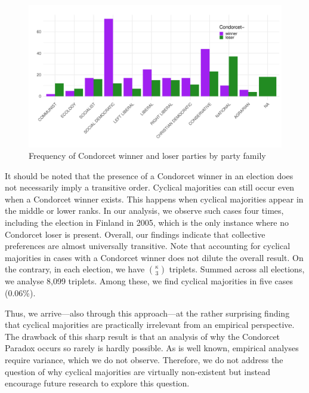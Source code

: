\documentclass[12pt]{scrartcl}
\begin{document}
\begin{figure}
	\centering
	\caption{Frequency of Condorcet winner and loser parties by party family \label{f1}}
\includegraphics[width=\linewidth]{barplotraw}
\end{figure}

It should be noted that the presence of a Condorcet winner in an election does not necessarily imply a transitive order. Cyclical majorities can still occur even when a Condorcet winner exists. This happens when cyclical majorities appear in the middle or lower ranks. In our analysis, we observe such cases four times, including the election in Finland in 2005, which is the only instance where no Condorcet loser is present. Overall, our findings indicate that collective preferences are almost universally transitive. Note that accounting for cyclical majorities in cases with a Condorcet winner does not dilute the overall result. On the contrary, in each election, we have $\binom{\kappa}{3}$ triplets. Summed across all elections, we analyse 8,099 triplets. Among these, we find cyclical majorities in five cases (0.06\%).

Thus, we arrive—also through this approach—at the rather surprising finding that cyclical majorities are practically irrelevant from an empirical perspective. The drawback of this sharp result is that an analysis of why the Condorcet Paradox occurs so rarely is hardly possible. As is well known, empirical analyses require variance, which we do not observe. Therefore, we do not address the question of why cyclical majorities are virtually non-existent but instead encourage future research to explore this question.
\end{document}
